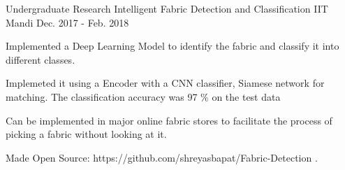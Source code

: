 


\begin{cventries}


\cventry
{Undergraduate Research} %
{Intelligent Fabric Detection and Classification} %
{IIT Mandi} %
{Dec. 2017 - Feb. 2018} %
{ %
\begin{cvitems}
\item {Implemented a Deep Learning Model to identify the fabric and classify it into different classes.}
\item {Implemeted it using a Encoder with a CNN classifier, Siamese network for matching. The classification accuracy was 97 \% on the test data}
\item {Can be implemented in major online fabric stores to facilitate the process of picking a fabric without looking at it.}
\item {Made Open Source: https://github.com/shreyasbapat/Fabric-Detection .}
\end{cvitems}
}





\end{cventries}
